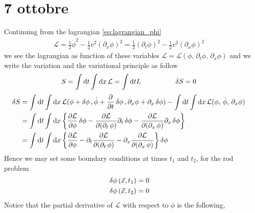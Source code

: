 \documentclass[class=article]{standalone}
\begin{document}
\newpage
\section{7 ottobre}
Continuing from the lagrangian \ref{eq:lagrangian_phi} 
\begin{equation*}
\begin{split}
\mathcal{L}  = \frac{1}{2} \dot \phi^2 - \frac{1}{2} v^2 (\partial_x \phi)^2 = \frac{1}{2} (\partial_t \phi)^{2}  - \frac{1}{2} v^2 (\partial_x \phi)^{2}
\end{split}
\end{equation*}
we see the lagrangian as function of these variables $\mathcal{L} = \mathcal{L}(\phi, \, \partial_t \phi, \, \partial_x \phi)$ and we write the variation and the variational principle as follow
\begin{equation*}
\begin{split}
S =  \int \dd t \int \dd x \, \mathcal{L} =  \int \dd t L
\end{split}\quad\quad\quad\quad\quad
\begin{split}
\var{S} = 0
\end{split}
\end{equation*}
\begin{equation*}
\begin{split}
\var{S} & = \int \dd t \int \dd x \, \mathcal{L}(\phi + \var{\phi}, \dot \phi + \pdv{t} \var{\phi}, \partial_x \phi + \partial_x \var{\phi}) 
- \int \dd t \int \dd x \, \mathcal{L}(\phi , \, \dot \phi , \, \partial_x \phi ) \\
& = \int\dd t\int \dd x\, \qty\bigg{\pdv{\mathcal{L}}{\phi} \var{\phi} - \pdv{\mathcal{L}}{(\partial_t \,\phi)} \partial_t \var{\phi} - \pdv{\mathcal{L}}{(\partial_x \,\phi) } \partial_x \var{\phi}} \\
& = \int \dd t \int \dd x \, \qty\bigg{  \pdv{\mathcal{L}}{\phi} - \partial_t \pdv{\mathcal{L}}{(\partial_t \,\phi)} - \partial_x \pdv{\mathcal{L}}{(\partial_x \,\phi)}  } \var{\phi} 
\end{split}
\end{equation*}
Hence we may set some boundary conditions at times $t_1$ and $t_2$, for the rod problem
\begin{equation*}
\begin{split}
& \var{\phi}(\vec x, t_1) = 0 \\
& \var{\phi}(\vec x, t_2) = 0
\end{split}
\end{equation*}
Notice that the partial derivative of $\mathcal{L}$ with respect to $\phi$ is the following, 
\end{document}
